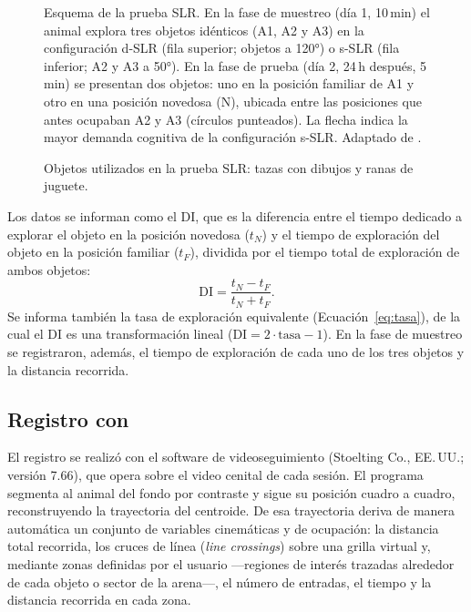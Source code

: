 \begin{figure}[htbp]
  \centering
  \caption[Esquema de la prueba SLR]{Esquema de la prueba SLR. En la fase de muestreo (día 1, 10\,min) el animal explora tres objetos idénticos (A1, A2 y A3) en la configuración d-SLR (fila superior; objetos a 120°) o s-SLR (fila inferior; A2 y A3 a 50°). En la fase de prueba (día 2, 24\,h después, 5\,min) se presentan dos objetos: uno en la posición familiar de A1 y otro en una posición novedosa (N), ubicada entre las posiciones que antes ocupaban A2 y A3 (círculos punteados). La flecha indica la mayor demanda cognitiva de la configuración s-SLR. Adaptado de \cite{reichelt2021slr}.}
  \label{fig:esquema-slr}
\end{figure}

\begin{figure}[htbp]
  \centering
  \caption{Objetos utilizados en la prueba SLR: tazas con dibujos y ranas de juguete.}
  \label{fig:objetos-slr}
\end{figure}

Los datos se informan como el DI, que es la diferencia entre el tiempo dedicado a explorar el objeto en la posición novedosa ($t_N$) y el tiempo de exploración del objeto en la posición familiar ($t_F$), dividida por el tiempo total de exploración de ambos objetos:
\begin{equation}
  \mathrm{DI} = \frac{t_N - t_F}{t_N + t_F}.
  \label{eq:di}
\end{equation}
Se informa también la tasa de exploración equivalente (Ecuación~\ref{eq:tasa}), de la cual el DI es una transformación lineal ($\mathrm{DI} = 2\cdot\text{tasa} - 1$). En la fase de muestreo se registraron, además, el tiempo de exploración de cada uno de los tres objetos y la distancia recorrida.

\subsection{Registro con \anymaze}\label{sec:principio}

El registro se realizó con el software de videoseguimiento \anymaze{} (Stoelting Co., EE.\,UU.; versión 7.66), que opera sobre el video cenital de cada sesión. El programa segmenta al animal del fondo por contraste y sigue su posición cuadro a cuadro, reconstruyendo la trayectoria del centroide. De esa trayectoria deriva de manera automática un conjunto de variables cinemáticas y de ocupación: la distancia total recorrida, los cruces de línea (\textit{line crossings}) sobre una grilla virtual y, mediante zonas definidas por el usuario ---regiones de interés trazadas alrededor de cada objeto o sector de la arena---, el número de entradas, el tiempo y la distancia recorrida en cada zona.

